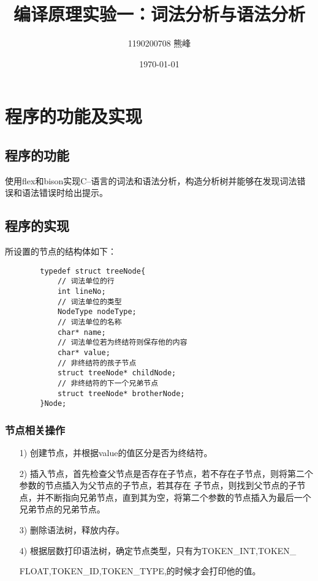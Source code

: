 \documentclass[UTF8]{ctexart}
\title{编译原理实验一：词法分析与语法分析}
\author{1190200708 熊峰}
\date{\today}
\begin{document}
 
\maketitle 

\section{程序的功能及实现} 
\subsection{程序的功能}
使用flex和bison实现C--语言的词法和语法分析，构造分析树并能够在发现词法错误和语法错误时给出提示。\par
\subsection{程序的实现}

所设置的节点的结构体如下：\par
\lstset{language=C}
    \begin{lstlisting}
        typedef struct treeNode{
            // 词法单位的行
            int lineNo;
            // 词法单位的类型
            NodeType nodeType;
            // 词法单位的名称
            char* name;
            // 词法单位若为终结符则保存他的内容
            char* value;
            // 非终结符的孩子节点
            struct treeNode* childNode;
            // 非终结符的下一个兄弟节点
            struct treeNode* brotherNode;
        }Node;
    \end{lstlisting} 
\subsubsection{节点相关操作}
    \begin{itemize}
        \item [1)]
        创建节点，并根据value的值区分是否为终结符。\par
    
        \item [2)]
        插入节点，首先检查父节点是否存在子节点，若不存在子节点，则将第二个参数的节点插入为父节点的子节点，若其存在
        子节点，则找到父节点的子节点，并不断指向兄弟节点，直到其为空，将第二个参数的节点插入为最后一个兄弟节点的兄弟节点。\par
    
        \item [3)]
        删除语法树，释放内存。\par
        \item [4)]
        根据层数打印语法树，确定节点类型，只有为TOKEN\_INT,TOKEN\_\par
        FLOAT,TOKEN\_ID,TOKEN\_TYPE,的时候才会打印他的值。
    
    \end{itemize}
\end{document}
